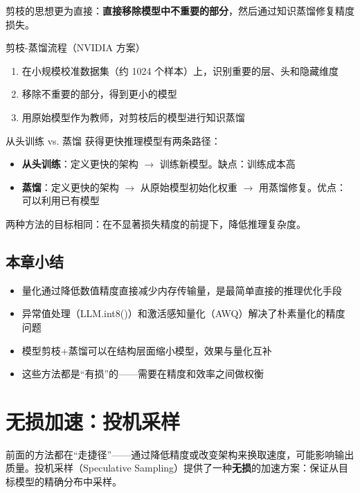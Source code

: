 \documentclass[a4paper]{article}
\begin{document}
剪枝的思想更为直接：\textbf{直接移除模型中不重要的部分}，然后通过知识蒸馏修复精度损失。

\begin{importantbox}{剪枝-蒸馏流程（NVIDIA 方案）}
\begin{enumerate}
    \item 在小规模校准数据集（约 1024 个样本）上，识别重要的层、头和隐藏维度
    \item 移除不重要的部分，得到更小的模型
    \item 用原始模型作为教师，对剪枝后的模型进行知识蒸馏
\end{enumerate}
\end{importantbox}

\begin{knowledgebox}{从头训练 vs. 蒸馏}
获得更快推理模型有两条路径：
\begin{itemize}
    \item \textbf{从头训练}：定义更快的架构 $\rightarrow$ 训练新模型。缺点：训练成本高
    \item \textbf{蒸馏}：定义更快的架构 $\rightarrow$ 从原始模型初始化权重 $\rightarrow$ 用蒸馏修复。优点：可以利用已有模型
\end{itemize}
两种方法的目标相同：在不显著损失精度的前提下，降低推理复杂度。
\end{knowledgebox}

\subsection{本章小结}

\begin{itemize}
    \item 量化通过降低数值精度直接减少内存传输量，是最简单直接的推理优化手段
    \item 异常值处理（LLM.int8()）和激活感知量化（AWQ）解决了朴素量化的精度问题
    \item 模型剪枝+蒸馏可以在结构层面缩小模型，效果与量化互补
    \item 这些方法都是``有损''的——需要在精度和效率之间做权衡
\end{itemize}


\section{无损加速：投机采样}

前面的方法都在``走捷径''——通过降低精度或改变架构来换取速度，可能影响输出质量。投机采样（Speculative Sampling）提供了一种\textbf{无损}的加速方案：保证从目标模型的精确分布中采样。
\end{document}
